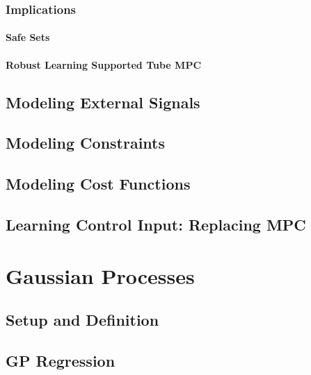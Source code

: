 			\subsubsection{Implications} %

				\paragraph{Safe Sets} %

				\paragraph{Robust Learning Supported Tube MPC} %

		\subsection{Modeling External Signals} %

		\subsection{Modeling Constraints} %

		\subsection{Modeling Cost Functions} %

		\subsection{Learning Control Input: Replacing MPC} %

	\section{Gaussian Processes} %

		\subsection{Setup and Definition} %

		\subsection{GP Regression} %

